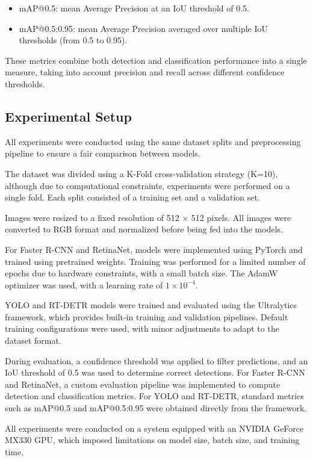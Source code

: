 \documentclass[12pt,a4paper]{article} %
\begin{document}
\begin{itemize}
    \item mAP@0.5: mean Average Precision at an IoU threshold of 0.5.
    \item mAP@0.5:0.95: mean Average Precision averaged over multiple IoU thresholds (from 0.5 to 0.95).
\end{itemize}

These metrics combine both detection and classification performance into a single measure, taking into account precision and recall across different confidence thresholds.

\subsection{Experimental Setup}

All experiments were conducted using the same dataset splits and preprocessing pipeline to ensure a fair comparison between models.

The dataset was divided using a K-Fold cross-validation strategy (K=10), although due to computational constraints, experiments were performed on a single fold. Each split consisted of a training set and a validation set.

Images were resized to a fixed resolution of 512 × 512 pixels. All images were converted to RGB format and normalized before being fed into the models.

For Faster R-CNN and RetinaNet, models were implemented using PyTorch and trained using pretrained weights. Training was performed for a limited number of epochs due to hardware constraints, with a small batch size. The AdamW optimizer was used, with a learning rate of $1 \times 10^{-4}$.

YOLO and RT-DETR models were trained and evaluated using the Ultralytics framework, which provides built-in training and validation pipelines. Default training configurations were used, with minor adjustments to adapt to the dataset format.

During evaluation, a confidence threshold was applied to filter predictions, and an IoU threshold of 0.5 was used to determine correct detections. For Faster R-CNN and RetinaNet, a custom evaluation pipeline was implemented to compute detection and classification metrics. For YOLO and RT-DETR, standard metrics such as mAP@0.5 and mAP@0.5:0.95 were obtained directly from the framework.

All experiments were conducted on a system equipped with an NVIDIA GeForce MX330 GPU, which imposed limitations on model size, batch size, and training time.
\end{document}
